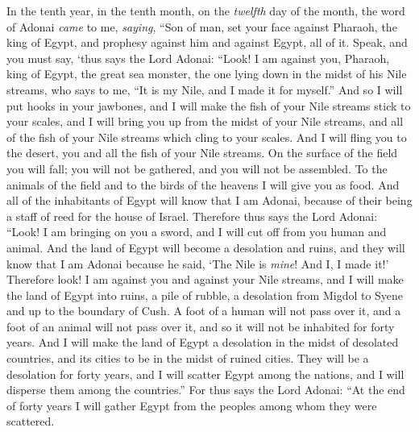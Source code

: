 \begin{biblechapter} %
 In the tenth year, in the tenth month, on the \textit{twelfth} day of the month, the word of Adonai \textit{came} to me, \textit{saying},
\verse “Son of man, set your face against Pharaoh, the king of Egypt, and prophesy against him and against Egypt, all of it.
\verse Speak, and you must say, ‘thus says the Lord Adonai:
\verse “Look! I am against you, 
Pharaoh, king of Egypt, 
the great sea monster, 
the one lying down 
in the midst of his Nile streams, 
who says to me, “It is my Nile, and I made it for myself.”
\verse And so I will put hooks in your jawbones, 
and I will make the fish of your Nile streams stick to your scales, 
and I will bring you up from the midst of your Nile streams, 
and all of the fish of your Nile streams which cling to your scales.
\verse And I will fling you to the desert, 
you and all the fish of your Nile streams. 
On the surface of the field you will fall; 
you will not be gathered, 
and you will not be assembled. 
To the animals of the field 
and to the birds of the heavens 
I will give you as food.
\verse And all of the inhabitants of Egypt will know that I am Adonai, 
because of their being a staff of reed for the house of Israel.
\verse Therefore thus says the Lord Adonai: “Look! I am bringing on you a sword, and I will cut off from you human and animal.
\verse And the land of Egypt will become a desolation and ruins, and they will know that I am Adonai because he said, ‘The Nile is \textit{mine}! And I, I made it!’
\verse Therefore look! I am against you and against your Nile streams, and I will make the land of Egypt into ruins, a pile of rubble, a desolation from Migdol to Syene and up to the boundary of Cush.
\verse A foot of a human will not pass over it, and a foot of an animal will not pass over it, and so it will not be inhabited for forty years.
\verse And I will make the land of Egypt a desolation in the midst of desolated countries, and its cities to be in the midst of ruined cities. They will be a desolation for forty years, and I will scatter Egypt among the nations, and I will disperse them among the countries.”
\verse For thus says the Lord Adonai: “At the end of forty years I will gather Egypt from the peoples among whom they were scattered.

\end{biblechapter}
